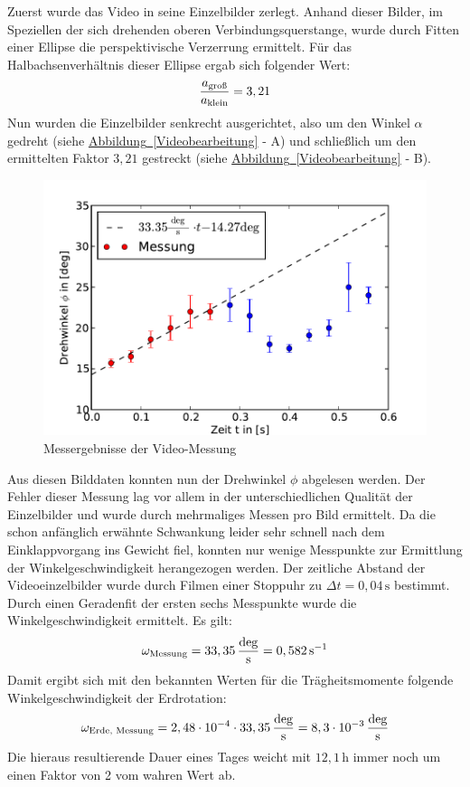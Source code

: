 \documentclass[halfparskip, 11pt]{scrartcl}
\newcommand{\unit}[1]{\ensuremath{\,\mathrm{#1}}} %
\newcommand{\ee}[1]{\ensuremath{\cdot 10^{#1}}}
\newcommand{\ltext}[1]{\ensuremath{_{\textnormal{#1}}}}
\newcommand{\hypref}[2]{\hyperref[#2]{{#1}~\ref{#2}}}
\begin{document}
Zuerst wurde das Video in seine Einzelbilder zerlegt. Anhand dieser Bilder, im Speziellen der sich drehenden oberen Verbindungsquerstange, wurde durch Fitten einer Ellipse die perspektivische Verzerrung ermittelt. Für das Halbachsenverhältnis dieser Ellipse ergab sich folgender Wert:
\begin{equation}
\frac{a\ltext{groß}}{a\ltext{klein}}=3,21
\end{equation}
Nun wurden die Einzelbilder senkrecht ausgerichtet, also um den Winkel $\alpha$ gedreht (siehe \hypref{Abbildung}{Videobearbeitung} - A) und schließlich um den ermittelten Faktor $3,21$ gestreckt (siehe \hypref{Abbildung}{Videobearbeitung} - B).
\begin{figure}[ht]
\centering
\includegraphics[width=1.\textwidth]{messung_Video.pdf}
\caption{Messergebnisse der Video-Messung}
\label{messung_Video}
\end{figure}

Aus diesen Bilddaten konnten nun der Drehwinkel $\phi$ abgelesen werden. Der Fehler dieser Messung lag vor allem in der unterschiedlichen Qualität der Einzelbilder und wurde durch mehrmaliges Messen pro Bild ermittelt.
Da die schon anfänglich erwähnte Schwankung leider sehr schnell nach dem Einklappvorgang ins Gewicht fiel, konnten nur wenige Messpunkte zur Ermittlung der Winkelgeschwindigkeit herangezogen werden.
Der zeitliche Abstand der Videoeinzelbilder wurde durch Filmen einer Stoppuhr zu $\Delta t = 0,04\unit{s}$ bestimmt.
Durch einen Geradenfit der ersten sechs Messpunkte wurde die Winkelgeschwindigkeit ermittelt. Es gilt:
\begin{equation}
\omega\ltext{Messung} = 33,35 \unit{\frac{deg}{s}} = 0,582 \unit{s^{-1}}
\end{equation}
Damit ergibt sich mit den bekannten Werten für die Trägheitsmomente folgende Winkelgeschwindigkeit der Erdrotation:
\begin{equation}
\omega\ltext{Erde, Messung} = 
2,48\ee{-4}\cdot 33,35 \unit{\frac{deg}{s}}
= 8,3\ee{-3} \unit{\frac{deg}{s}}
\end{equation}
Die hieraus resultierende Dauer eines Tages weicht mit $12,1\unit{h}$ immer noch um einen Faktor von 2 vom wahren Wert ab.
\end{document}
